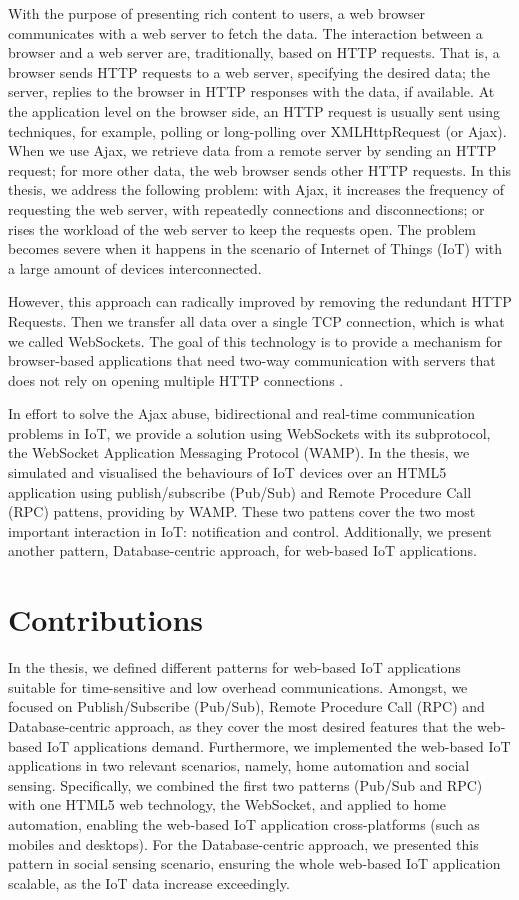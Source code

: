 With the purpose of presenting rich content to users, a web browser communicates with a web server to fetch the data. The interaction between a browser and a web server are, traditionally, based on HTTP requests. That is, a browser sends HTTP requests to a web server, specifying the desired data; the server, replies to the browser in HTTP responses with the data, if available. At the application level on the browser side, an HTTP request is usually sent using techniques, for example, polling or long-polling over XMLHttpRequest (or Ajax). When we use Ajax, we retrieve data from a remote server by sending an HTTP request; for more other data, the web browser sends other HTTP requests. In this thesis, we address the following problem: with Ajax, it increases the frequency of requesting the web server, with repeatedly connections and disconnections; or rises the workload of the web server to keep the requests open. The problem becomes severe when it happens in the scenario of Internet of Things (IoT) with a large amount of devices interconnected.

However, this approach can radically improved by removing the redundant HTTP Requests. Then we transfer all data over a single TCP connection, which is what we called WebSockets. The goal of this technology is to provide a mechanism for browser-based applications that need two-way communication with servers that does not rely on opening multiple HTTP connections \cite{rfc64552012web}.

In effort to solve the Ajax abuse, bidirectional and real-time communication problems in IoT, we provide a solution using WebSockets with its subprotocol, the WebSocket Application Messaging Protocol (WAMP). In the thesis, we simulated and visualised the behaviours of IoT devices over an HTML5 application using publish/subscribe (Pub/Sub) and Remote Procedure Call (RPC) pattens, providing by WAMP. These two pattens cover the two most important interaction in IoT: notification and control. Additionally, we present another pattern, Database-centric approach, for web-based IoT applications. 

\section{Contributions}

In the thesis, we defined different patterns for web-based IoT applications suitable for time-sensitive and low overhead communications. Amongst, we focused on Publish/Subscribe (Pub/Sub), Remote Procedure Call (RPC) and Database-centric approach, as they cover the most desired features that the web-based IoT applications demand. Furthermore, we implemented the web-based IoT applications in two relevant scenarios, namely, home automation and social sensing. Specifically, we combined the first two patterns (Pub/Sub and RPC) with one HTML5 web technology, the WebSocket, and applied to home automation, enabling the web-based IoT application cross-platforms (such as mobiles and desktops). For the Database-centric approach, we presented this pattern in social sensing scenario, ensuring the whole web-based IoT application scalable, as the IoT data increase exceedingly.

